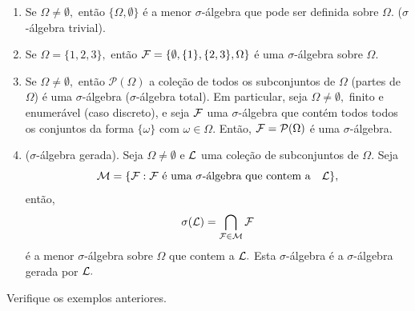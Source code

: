\begin{frame}
\begin{exem}
	\begin{enumerate}
		\item  Se $\Omega\neq \emptyset,$ então $\{\Omega, \emptyset \}$ é a menor
		$\sigma$-álgebra que pode ser definida sobre $\Omega.$  ($\sigma$-álgebra trivial). 
		
		\item Se $\Omega  = \{ 1, 2, 3 \},$ então ${\cal F} = \{  \emptyset, \{ 1 \}, \{ 2, 3 \}, \Omega \} $ é uma $\sigma$-álgebra sobre $\Omega.$ 
		
		\item  Se $\Omega\neq \emptyset,$ então $ \mathcal{P}(\Omega )$ a coleção de todos os subconjuntos de $\Omega$ (partes de $\Omega$) é uma $\sigma$-álgebra ($\sigma$-álgebra total). Em particular, seja $\Omega\neq \emptyset,$ finito e enumerável (caso discreto), e seja ${\cal F}$ uma 
		$\sigma$-álgebra que contém todos todos os conjuntos da forma $\{ \omega \}$ com $\omega \in \Omega.$ Então, 
		${\cal F} = \mathcal{P}(\Omega )$ é uma $\sigma$-álgebra.
		
	\item ($\sigma$-álgebra gerada). Seja $\Omega\neq \emptyset$ e ${\cal L}$ uma coleção de subconjuntos de $\Omega.$ Seja $${\cal  M}=\{{\cal F}: {\cal F} \ \text{é uma $\sigma$-álgebra que contem a} \quad {\cal L}  \},$$ então, 
$$\sigma({\cal L}) = \bigcap_{{\cal F} \in {\cal M}}{\cal F}$$ é a menor $\sigma$-álgebra sobre $\Omega$ que contem a ${\cal L}.$ Esta $\sigma$-álgebra é a $\sigma$-álgebra gerada por ${\cal L}.$
		
		
	\end{enumerate} 
\end{exem} 

\begin{exer}
	Verifique os exemplos anteriores.
	\end{exer}

\end{frame}

